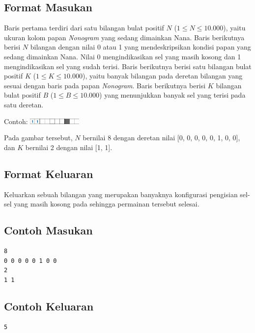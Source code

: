 \documentclass{article}
\begin{document}
\subsection*{Format Masukan}

Baris pertama terdiri dari satu bilangan bulat positif $N$ ($1 \leq N \leq 10.000$), yaitu ukuran kolom papan \textit{Nonogram} yang sedang dimainkan Nana.
Baris berikutnya berisi $N$ bilangan dengan nilai 0 atau 1 yang mendeskripsikan kondisi papan  yang sedang dimainkan Nana. 
Nilai 0 mengindikasikan sel yang masih kosong dan 1 mengindikasikan sel yang sudah terisi.
Baris berikutnya berisi satu bilangan bulat positif $K$ ($1 \leq K \leq 10.000$), yaitu banyak bilangan pada deretan bilangan yang sesuai dengan baris pada papan \textit{Nonogram}.
Baris berikutnya berisi $K$ bilangan bulat positif $B$ ($1 \leq B \leq 10.000$) yang menunjukkan banyak sel yang terisi pada satu deretan.

Contoh:
\includegraphics[width=100px]{Nonogram-Row}

Pada gambar tersebut, $N$ bernilai 8 dengan deretan nilai [0, 0, 0, 0, 0, 1, 0, 0], dan $K$ bernilai 2 dengan nilai [1, 1].

\subsection*{Format Keluaran}

Keluarkan sebuah bilangan yang merupakan banyaknya konfigurasi pengisian sel-sel yang masih kosong pada  
sehingga permainan tersebut selesai.
\\

\begin{multicols}{2}
\subsection*{Contoh Masukan}
\begin{lstlisting}
8
0 0 0 0 0 1 0 0
2
1 1
\end{lstlisting}
\columnbreak
\subsection*{Contoh Keluaran}
\begin{lstlisting}
5
\end{lstlisting}
\vfill
\null
\end{multicols}

\pagebreak
\end{document}
